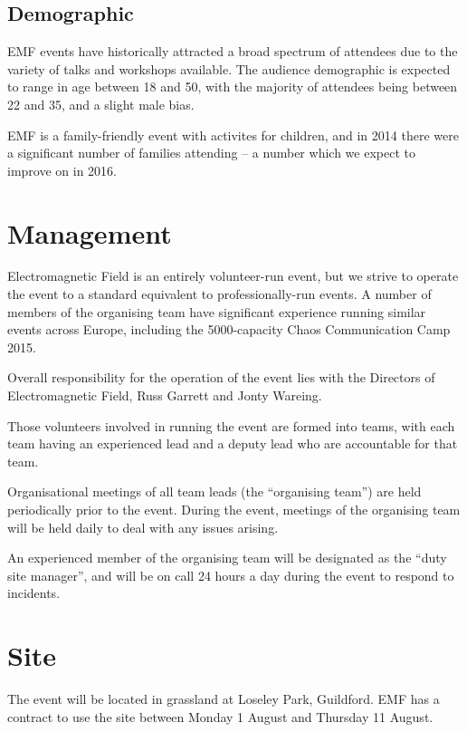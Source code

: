 \subsection{Demographic}

EMF events have historically attracted a broad spectrum of attendees due to the variety of talks
and workshops available. The audience demographic is expected to range in age between
18 and 50, with the majority of attendees being between 22 and 35, and a slight male bias.

EMF is a family-friendly event with activites for children, and in 2014 there were a significant
number of families attending -- a number which we expect to improve on in 2016.

\section{Management}

Electromagnetic Field is an entirely volunteer-run event, but we strive to operate the event to
a standard equivalent to professionally-run events. A number of members of the organising team have
significant experience running similar events across Europe, including the 5000-capacity
Chaos Communication Camp 2015.

Overall responsibility for the operation of the event lies with the Directors of Electromagnetic Field,
Russ Garrett and Jonty Wareing.

Those volunteers involved in running the event are formed into teams, with each team having an
experienced lead and a deputy lead who are accountable for that team.

Organisational meetings of all team leads (the ``organising team'') are held periodically prior to the event.
During the event, meetings of the organising team will be held daily to deal with any issues arising.

An experienced member of the organising team will be designated as the ``duty site manager'', and will be
on call 24 hours a day during the event to respond to incidents.

\section{Site}

The event will be located in grassland at Loseley Park, Guildford. EMF has a contract to use the site between
Monday 1 August and Thursday 11 August.

